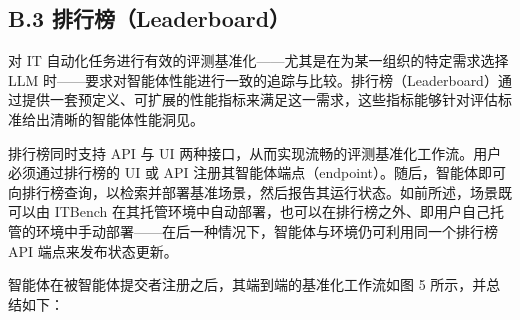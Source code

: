 \documentclass[10pt,UTF8,fontset=fandol]{ctexart}
\begin{document}
\subsection{B.3 排行榜（Leaderboard）}

对 IT 自动化任务进行有效的评测基准化——尤其是在为某一组织的特定需求选择 LLM 时——要求对智能体性能进行一致的追踪与比较。排行榜（Leaderboard）通过提供一套预定义、可扩展的性能指标来满足这一需求，这些指标能够针对评估标准给出清晰的智能体性能洞见。

排行榜同时支持 API 与 UI 两种接口，从而实现流畅的评测基准化工作流。用户必须通过排行榜的 UI 或 API 注册其智能体端点（endpoint）。随后，智能体即可向排行榜查询，以检索并部署基准场景，然后报告其运行状态。如前所述，场景既可以由 ITBench 在其托管环境中自动部署，也可以在排行榜之外、即用户自己托管的环境中手动部署——在后一种情况下，智能体与环境仍可利用同一个排行榜 API 端点来发布状态更新。

智能体在被智能体提交者注册之后，其端到端的基准化工作流如图 5 所示，并总结如下：
\end{document}
